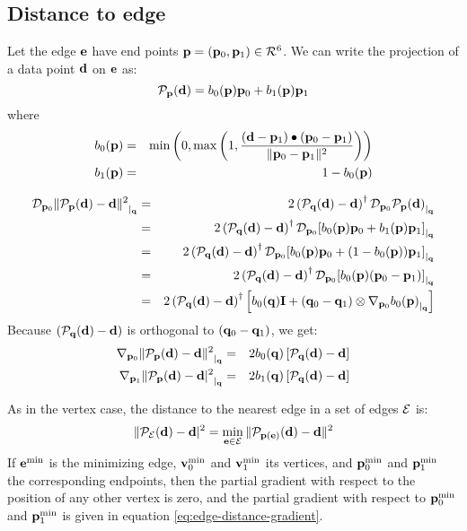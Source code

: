 \subsection{Distance to edge}
\label{sec:Distance-to-edge}

Let the edge ${\mathbf e}$ have end points ${\mathbf p} = ({\mathbf p}_0, {\mathbf p}_1) \in \mathcal{R}^6$.
We can write the projection of a data point ${\mathbf d}$ on ${\mathbf e}$ as:
\begin{equation}
{\mathcal P}_{\mathbf p} ({\mathbf d}) = b_0({\mathbf p}) {\mathbf p}_0 + b_1({\mathbf p}) {\mathbf p}_1
\end{equation}
where
\begin{eqnarray}
b_0({\mathbf p}) & = &
\min\left(0,\max\left(1,
{{ ({\mathbf d} - {\mathbf p}_1) \bullet ({\mathbf p}_0 - {\mathbf p}_1) }
\over
{ \| {\mathbf p}_0 - {\mathbf p}_1 \|^2 }
}\right) \right) \\
b_1({\mathbf p}) & = & 1 - b_0({\mathbf p})
\nonumber
\end{eqnarray}

\begin{eqnarray}
\label{eq:edge-distance-gradient-derivation}
\De{\p_0}{ \| \Pr_{\p} (\d) - \d \|^2 }{\q}
& = &
2 \left( \Pr_{\q} (\d) - \d \right)^\dagger
\De{\p_0}{\Pr_{\p} (\d) }{\q}
\\
& = &
2 \left( \Pr_{\q} (\d) - \d \right)^\dagger
\De{\p_0}{\left[ b_0(\p)\p_0 + b_1(\p)\p_1 \right]}{\q}
\nonumber \\
& = &
2 \left( \Pr_{\q} (\d) - \d \right)^\dagger
\De{\p_0}{\left[ b_0(\p)\p_0 + (1 - b_0(\p))\p_1 \right]}{\q}
\nonumber \\
& = &
2 \left( \Pr_{\q} (\d) - \d \right)^\dagger
\De{\p_0}{\left[ b_0(\p)(\p_0 - \p_1) \right]}{\q}
\nonumber \\
& = &
2 \left( \Pr_{\q} (\d) - \d \right)^\dagger
\left[ b_0(\q) \I + (\q_0 - \q_1) \otimes \Gc{\p_0}{b_0(\p)}{\q} \right]
\nonumber
\end{eqnarray}
Because $\left( {\mathcal P}_{{\mathbf q}} ({\mathbf d}) - {\mathbf d} \right)$ is orthogonal to
$\left( {\mathbf q}_0 - {\mathbf q}_1 \right)$, we get:
\begin{eqnarray}
\label{eq:edge-distance-gradient}
\Gc{\p_0}{ \| \Pr_{\p} (\d) - \d \|^2 }{\q}
& = & 2 b_0(\q) \left[ \Pr_{\q} (\d) - \d \right]
\\
\Gc{\p_1}{ \| \Pr_{\p} (\d) - \d|^2 }{\q}
& = & 2 b_1(\q) \left[ \Pr_\q (\d) - \d \right]
\nonumber
\end{eqnarray}

As in the vertex case,
the distance to the nearest edge in a set of edges ${\mathcal E}$ is:
\begin{equation}
\| {\mathcal P}_{{\mathcal E}} ({\mathbf d}) - {\mathbf d}|^2 = \min_{{\mathbf e} \in {\mathcal E}} \| {\mathcal P}_{{\mathbf p}({\mathbf e})}({\mathbf d}) - {\mathbf d} \|^2
\end{equation}
If ${\mathbf e}^{\min}$ is the minimizing edge,
${\mathbf v}_0^{\min}$ and ${\mathbf v}_1^{\min}$ its vertices,
and ${\mathbf p}_0^{\min}$ and ${\mathbf p}_1^{\min}$
the corresponding endpoints,
then the partial gradient with respect to
the position of any
other vertex is zero,
and the partial gradient with respect to ${\mathbf p}_0^{\min}$ and ${\mathbf p}_1^{\min}$
is given in equation \ref{eq:edge-distance-gradient}.

